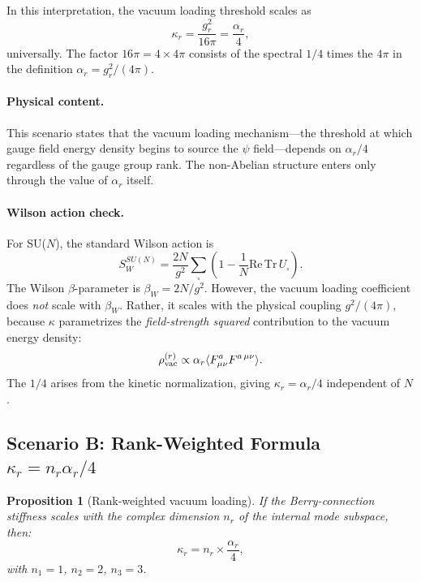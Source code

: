 \documentclass[11pt,letterpaper]{article}
\newcommand{\Tr}{\mathrm{Tr}}
\newtheorem{proposition}{Proposition}
\theoremstyle{definition}
\begin{document}
In this interpretation, the vacuum loading threshold scales as
\begin{equation}
\kappa_r = \frac{g_r^2}{16\pi} = \frac{\alpha_r}{4},
\end{equation}
universally.  The factor $16\pi = 4 \times 4\pi$ consists of the
spectral $1/4$ times the $4\pi$ in the definition
$\alpha_r = g_r^2/(4\pi)$.

\paragraph{Physical content.}
This scenario states that the vacuum loading mechanism---the threshold
at which gauge field energy density begins to source the $\psi$
field---depends on $\alpha_r/4$ regardless of the gauge group rank.
The non-Abelian structure enters only through the value of
$\alpha_r$ itself.

\paragraph{Wilson action check.}
For SU($N$), the standard Wilson action is
\begin{equation}
S_W^{SU(N)} = \frac{2N}{g^2} \sum_\square
\left(1 - \frac{1}{N}\mathrm{Re}\,\Tr\,U_\square\right).
\end{equation}
The Wilson $\beta$-parameter is $\beta_W = 2N/g^2$.  However,
the vacuum loading coefficient does \emph{not} scale with $\beta_W$.
Rather, it scales with the physical coupling $g^2/(4\pi)$, because
$\kappa$ parametrizes the \emph{field-strength squared} contribution
to the vacuum energy density:
\begin{equation}
\rho_{\rm vac}^{(r)} \propto \alpha_r \langle F_{\mu\nu}^a F^{a\,\mu\nu} \rangle.
\end{equation}
The $1/4$ arises from the kinetic normalization, giving $\kappa_r = \alpha_r/4$
independent of $N$.

\subsection{Scenario B: Rank-Weighted Formula $\kappa_r = n_r \alpha_r/4$}
\label{sec:scenarioB}

\begin{proposition}[Rank-weighted vacuum loading]\label{prop:rank}
If the Berry-connection stiffness scales with the complex dimension
$n_r$ of the internal mode subspace, then:
\begin{equation}\label{eq:kappa-rank}
\boxed{\kappa_r = n_r \times \frac{\alpha_r}{4},}
\end{equation}
with $n_1 = 1$, $n_2 = 2$, $n_3 = 3$.
\end{proposition}
\end{document}
